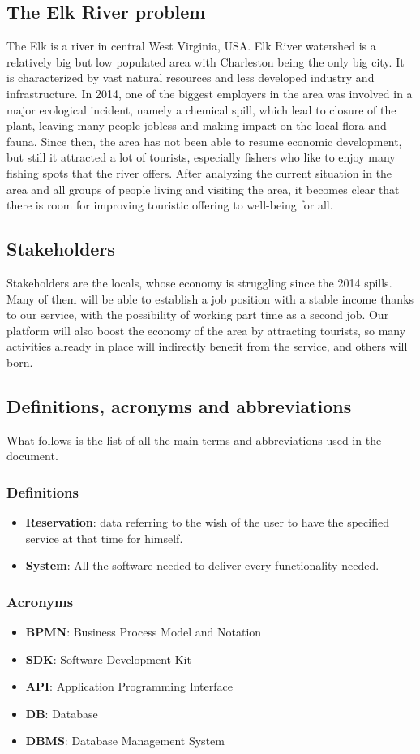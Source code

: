 \subsection{The Elk River problem}
The Elk is a river in central West Virginia, USA. Elk River watershed is a relatively big but low populated area with Charleston being the only big city. It is characterized by vast natural resources and less developed industry and infrastructure. In 2014, one of the biggest employers in the area was involved in a major ecological incident, namely a chemical spill, which lead to closure of the plant, leaving many people jobless and making impact on the local flora and fauna. Since then, the area has not been able to resume economic development, but still it attracted a lot of tourists, especially fishers who like to enjoy many fishing spots that the river offers. After analyzing the current situation in the area and all groups of people living and visiting the area, it becomes clear that there is room for improving touristic offering to well-being for all.
\subsection{Stakeholders}
Stakeholders are the locals, whose economy is struggling since the 2014 spills. Many of them will be able to establish a job position with a stable income thanks to our service, with the possibility of working part time as a second job. Our platform will also boost the economy of the area by attracting tourists, so many activities already in place will indirectly benefit from the service, and others will born.
\subsection{Definitions, acronyms and abbreviations}
What follows is the list of all the main terms and abbreviations used in the document.
\subsubsection{Definitions}
\begin{itemize}
\item \textbf{Reservation}: data referring to the wish of the user to have the specified service at that time for himself.
\item \textbf{System}: All the software needed to deliver every functionality needed.
\end{itemize}
\subsubsection{Acronyms}
\begin{itemize}
\item \textbf{BPMN}: Business Process Model and Notation
\item \textbf{SDK}: Software Development Kit
\item \textbf{API}: Application Programming Interface
\item \textbf{DB}: Database
\item \textbf{DBMS}: Database Management System
\end{itemize}
